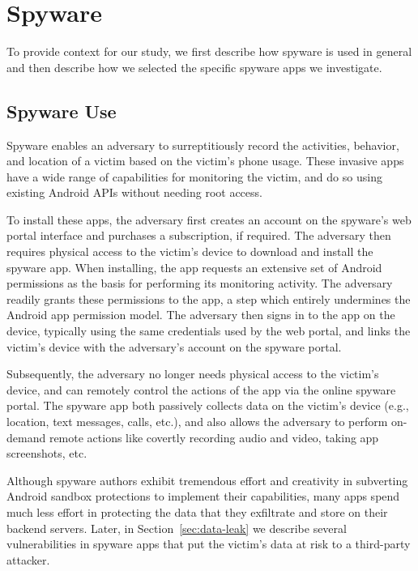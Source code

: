

\section{Spyware}

To provide context for our study, we first describe how spyware is
used in general and then describe how we selected the specific spyware
apps we investigate.

\subsection{Spyware Use}

Spyware enables an adversary to surreptitiously record the activities,
behavior, and location of a victim based on the victim's phone usage.
These invasive apps have a wide range of capabilities for
monitoring the victim, and do so using existing Android APIs without
needing root access.

To install these apps, the adversary first creates an account on the spyware's web portal
interface and purchases a subscription, if required.  The adversary then
requires physical access to the victim's device to download and
install the spyware app.  When installing, the app requests an
extensive set of Android permissions as the basis for performing its
monitoring activity.  The adversary readily grants these permissions to
the app, a step which entirely undermines the Android app permission
model.  The adversary then signs in to the app on the device, typically
using the same credentials used by the web portal, and links the
victim's device with the adversary's account on the spyware portal.

Subsequently, the adversary no longer needs physical access to the victim's device, and
can remotely control the actions of the app via the online spyware portal.
The spyware app both passively collects data on the victim's device (e.g.,
location, text messages, calls, etc.), and also allows the adversary to
perform on-demand remote actions like covertly recording audio and
video, taking app screenshots, etc.

Although spyware authors exhibit tremendous effort and creativity in subverting
Android sandbox protections to implement their capabilities, many apps spend
much less effort in protecting the data that they exfiltrate and store on
their backend servers. Later, in Section~\ref{sec:data-leak} we
describe several vulnerabilities in spyware apps that put the victim's
data at risk to a third-party attacker.



